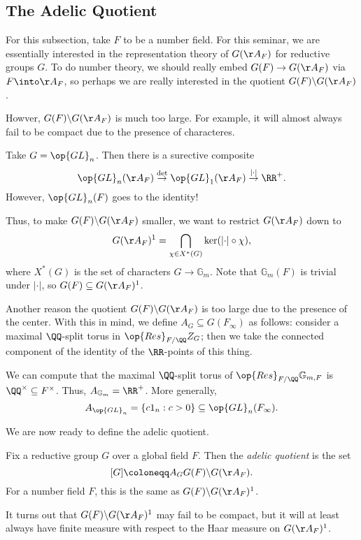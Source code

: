 \documentclass{article}
\begin{document}
\subsection{The Adelic Quotient}
For this subsection, take $F$ to be a number field. For this seminar, we are essentially interested in the representation theory of $G(\AA_F)$ for reductive groups $G$. To do number theory, we should really embed $G(F)\to G(\AA_F)$ via $F\into\AA_F$, so perhaps we are really interested in the quotient $G(F)\backslash G(\AA_F)$.

Howver, $G(F)\backslash G(\AA_F)$ is much too large. For example, it will almost always fail to be compact due to the presence of characteres.
\begin{example}
	Take $G=\op{GL}_n$. Then there is a surective composite
	\[\op{GL}_n(\AA_F)\stackrel\det\to\op{GL}_1(\AA_F)\stackrel{\left|\cdot\right|}\to\RR^+.\]
	However, $\op{GL}_n(F)$ goes to the identity!
\end{example}
Thus, to make $G(F)\backslash G(\AA_F)$ smaller, we want to restrict $G(\AA_F)$ down to
\[G(\AA_F)^1=\bigcap_{\chi\in X^*(G)}\ker(\left|\cdot\right|\circ\chi),\]
where $X^*(G)$ is the set of characters $G\to\mathbb G_m$. Note that $\mathbb G_m(F)$ is trivial under $\left|\cdot\right|$, so $G(F)\subseteq G(\AA_F)^1$.

Another reason the quotient $G(F)\backslash G(\AA_F)$ is too large due to the presence of the center. With this in mind, we define $A_G\subseteq G(F_\infty)$ as follows: consider a maximal $\QQ$-split torus in $\op{Res}_{F/\QQ}Z_G$; then we take the connected component of the identity of the $\RR$-points of this thing.
\begin{example}
	We can compute that the maximal $\QQ$-split torus of $\op{Res}_{F/\QQ}\mathbb G_{m,F}$ is $\QQ^\times\subseteq F^\times$. Thus, $A_{\mathbb G_m}=\RR^+$. More generally,
	\[A_{\op{GL}_n}=\{c1_n:c>0\}\subseteq\op{GL}_n(F_\infty).\]
\end{example}
We are now ready to define the adelic quotient.
\begin{definition}
	Fix a reductive group $G$ over a global field $F$. Then the \textit{adelic quotient} is the set
	\[[G]\coloneqq A_GG(F)\backslash G(\AA_F).\]
	For a number field $F$, this is the same as $G(F)\backslash G(\AA_F)^1$.
\end{definition}
\begin{remark}
	It turns out that $G(F)\backslash G(\AA_F)^1$ may fail to be compact, but it will at least always have finite measure with respect to the Haar measure on $G(\AA_F)^1$.
\end{remark}
\end{document}
